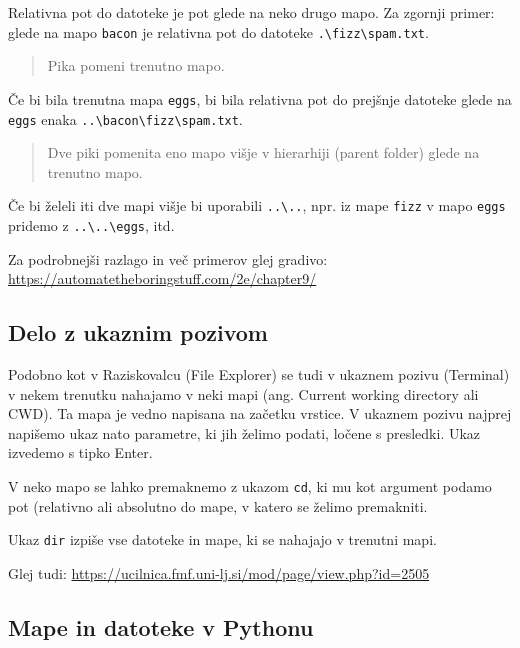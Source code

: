 \documentclass[
]{book}
\begin{document}
Relativna pot do datoteke je pot glede na neko drugo mapo. Za zgornji primer:
glede na mapo \texttt{bacon} je relativna pot do datoteke \texttt{.\textbackslash{}fizz\textbackslash{}spam.txt}.

\begin{quote}
Pika pomeni trenutno mapo.
\end{quote}

Če bi bila trenutna mapa \texttt{eggs}, bi bila relativna pot do prejšnje datoteke
glede na \texttt{eggs} enaka \texttt{..\textbackslash{}bacon\textbackslash{}fizz\textbackslash{}spam.txt}.

\begin{quote}
Dve piki pomenita eno mapo višje v hierarhiji (parent folder) glede na trenutno mapo.
\end{quote}

Če bi želeli iti dve mapi višje bi uporabili \texttt{..\textbackslash{}..}, npr. iz mape
\texttt{fizz} v mapo \texttt{eggs} pridemo z \texttt{..\textbackslash{}..\textbackslash{}eggs}, itd.

Za podrobnejši razlago in več primerov glej gradivo: \url{https://automatetheboringstuff.com/2e/chapter9/}

\hypertarget{delo-z-ukaznim-pozivom}{%
\subsection{Delo z ukaznim pozivom}\label{delo-z-ukaznim-pozivom}}

Podobno kot v Raziskovalcu (File Explorer) se tudi v ukaznem pozivu (Terminal) v
nekem trenutku nahajamo v neki mapi (ang. Current working directory ali CWD).
Ta mapa je vedno napisana na začetku vrstice.
V ukaznem pozivu najprej napišemo ukaz nato parametre, ki jih želimo podati, ločene
s presledki. Ukaz izvedemo s tipko Enter.

V neko mapo se lahko premaknemo z ukazom \texttt{cd}, ki mu kot argument podamo pot
(relativno ali absolutno do mape, v katero se želimo premakniti.

Ukaz \texttt{dir} izpiše vse datoteke in mape, ki se nahajajo v trenutni mapi.

Glej tudi: \url{https://ucilnica.fmf.uni-lj.si/mod/page/view.php?id=2505}

\hypertarget{mape-in-datoteke-v-pythonu}{%
\subsection{Mape in datoteke v Pythonu}\label{mape-in-datoteke-v-pythonu}}
\end{document}
